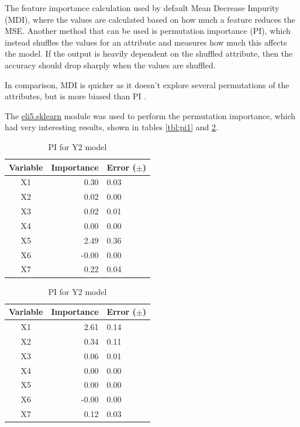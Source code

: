 \documentclass[12pt]{article}
\begin{document}
The feature importance calculation used by default Mean Decrease Impurity (MDI), where the values are calculated based on how much a feature reduces the MSE. Another method that can be used is permutation importance (PI), which instead shuffles the values for an attribute and measures how much this affects the model. If the output is heavily dependent on the shuffled attribute, then the accuracy should drop sharply when the values are shuffled.

In comparison, MDI is quicker as it doesn't explore several permutations of the attributes, but is more biased than PI \cite{aiimportance}.

The \url{eli5.sklearn} module was used to perform the permutation importance, which had very interesting results, shown in tables \ref{tbl:pi1} and \ref{tbl:pi2}.

\begin{table}[!htb]
    \begin{minipage}{.5\linewidth}
      \caption{PI for Y1 model}   
      \label{tbl:pi1}
      \centering
\begin{tabular}{||c|r|l||}
\hline
Variable    		& Importance & Error ($\pm$) \\
\hline
X1 & 0.30  & 0.03  \\
X2 & 0.02  & 0.00  \\
X3 & 0.02  & 0.01  \\
X4 & 0.00  & 0.00  \\
X5 & 2.49  & 0.36  \\
X6 &-0.00  & 0.00  \\
X7 & 0.22  & 0.04  \\
\hline
\end{tabular}
    \end{minipage}%
    \begin{minipage}{.5\linewidth}
      \centering
        \caption{PI for Y2 model}
              \label{tbl:pi2}
\begin{tabular}{||c|r|l||}
\hline
Variable    		& Importance & Error ($\pm$) \\
\hline
X1                   & 2.61 & 0.14   \\
X2                   & 0.34 & 0.11  \\
X3                   & 0.06 & 0.01 \\
X4                   & 0.00 & 0.00  \\
X5                   & 0.00 & 0.00  \\
X6                   &-0.00 & 0.00  \\
X7                   & 0.12 & 0.03   \\
\hline
\end{tabular}
    \end{minipage} 
\end{table}
\end{document}
